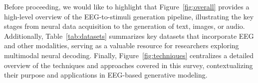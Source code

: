 Before proceeding, we would like to highlight that Figure~\ref{fig:overall} provides a high-level overview of the EEG-to-stimuli generation pipeline, illustrating the key stages from neural data acquisition to the generation of text, images, or audio. Additionally, Table~\ref{tab:datasets} summarizes key datasets that incorporate EEG and other modalities, serving as a valuable resource for researchers exploring multimodal neural decoding. Finally, Figure~\ref{fig:techniques} centralizes a detailed overview of the techniques and approaches covered in this survey, contextualizing their purpose and applications in EEG-based generative modeling.